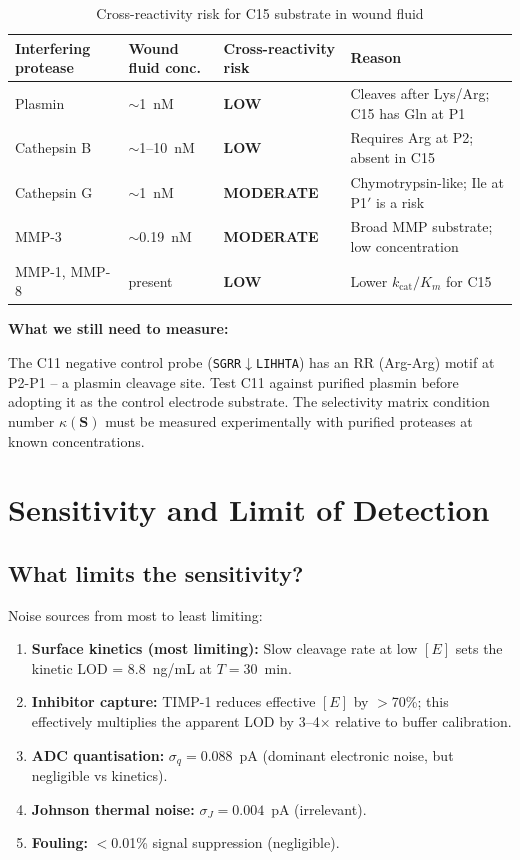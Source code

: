 \documentclass[10pt,a4paper]{article}
\newenvironment{needsbox}{%
  \begin{lrbox}{\tmpbox}\begin{minipage}{0.965\textwidth}\vspace{0.2em}%
  \textbf{\textcolor{ambertext}{What we still need to measure:}}\par\vspace{0.15em}}%
 {\vspace{0.2em}\end{minipage}\end{lrbox}%
  \par\vspace{0.4em}\noindent\colorbox{boxamber}{\usebox{\tmpbox}}\par\vspace{0.4em}}
\newcommand{\seq}[1]{\texttt{#1}}
\begin{document}
\begin{table}[H]
\centering
\caption{Cross-reactivity risk for C15 substrate in wound fluid}
\begin{tabularx}{\linewidth}{lXXl}
\toprule
Interfering protease & Wound fluid conc. & Cross-reactivity risk & Reason \\
\midrule
Plasmin & $\sim$1~nM & \textcolor{confgreen}{\textbf{LOW}} & Cleaves after Lys/Arg; C15 has Gln at P1 \\
Cathepsin B & $\sim$1--10~nM & \textcolor{confgreen}{\textbf{LOW}} & Requires Arg at P2; absent in C15 \\
Cathepsin G & $\sim$1~nM & \textcolor{ambertext}{\textbf{MODERATE}} & Chymotrypsin-like; Ile at P1$'$ is a risk \\
MMP-3 & $\sim$0.19~nM & \textcolor{ambertext}{\textbf{MODERATE}} & Broad MMP substrate; low concentration \\
MMP-1, MMP-8 & present & \textcolor{confgreen}{\textbf{LOW}} & Lower $k_\text{cat}/K_m$ for C15 \\
\bottomrule
\end{tabularx}
\end{table}

\begin{needsbox}
The C11 negative control probe (\seq{SGRR$\downarrow$LIHHTA}) has an RR (Arg-Arg) motif at
P2-P1 -- a plasmin cleavage site. Test C11 against purified plasmin before adopting it as
the control electrode substrate. The selectivity matrix condition number $\kappa(\mathbf{S})$
must be measured experimentally with purified proteases at known concentrations.
\end{needsbox}

\section{Sensitivity and Limit of Detection}

\subsection{What limits the sensitivity?}

Noise sources from most to least limiting:

\begin{enumerate}[noitemsep]
\item \textbf{Surface kinetics (most limiting):} Slow cleavage rate at low $[E]$ sets
  the kinetic LOD = 8.8~ng/mL at $T = 30$~min.
\item \textbf{Inhibitor capture:} TIMP-1 reduces effective $[E]$ by $>$70\%; this
  effectively multiplies the apparent LOD by 3--4$\times$ relative to buffer calibration.
\item \textbf{ADC quantisation:} $\sigma_q = 0.088$~pA (dominant electronic noise,
  but negligible vs kinetics).
\item \textbf{Johnson thermal noise:} $\sigma_J = 0.004$~pA (irrelevant).
\item \textbf{Fouling:} $<$0.01\% signal suppression (negligible).
\end{enumerate}
\end{document}
